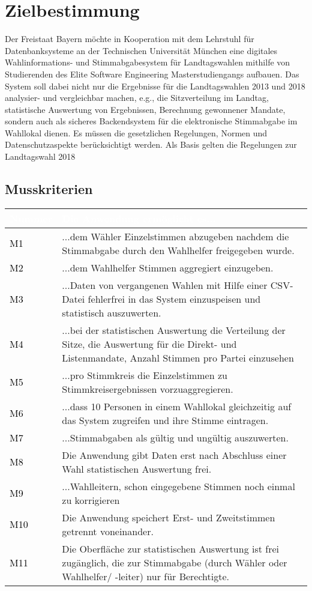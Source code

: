 \documentclass[a4paper,12pt]{article}
\newcommand\addrow[2]{\textcolor{black}{#1} &#2\\ \hline}
\newcommand\addheading[2]{\rowcolor{TUMBlue}\textcolor{white}{#1} & \textcolor{white}{#2}\\ \hline}
\newcommand\tabularhead{\begin{tabular}{|b|p{13cm}|}
\hline
}
\newenvironment{usecase}{\tabularhead}
{\hline\end{tabular}}
\begin{document}
 \setcounter{page}{2}

 \tableofcontents          %
 \clearpage
 
\section{Zielbestimmung}
Der Freistaat Bayern möchte in Kooperation mit dem Lehrstuhl für 
Datenbanksysteme an der Technischen Universität München eine digitales 
Wahlinformations- und Stimmabgabesystem für Landtagswahlen mithilfe von 
Studierenden des Elite Software Engineering Masterstudiengangs aufbauen.
%
Das System soll dabei nicht nur die Ergebnisse für die Landtagswahlen 
2013 und 2018 analysier- und vergleichbar machen, e.g., die Sitzverteilung 
im Landtag, statistische Auswertung von Ergebnissen, Berechnung gewonnener
Mandate, sondern auch als sicheres Backendsystem für die elektronische 
Stimmabgabe im Wahllokal dienen. 
%
Es müssen die gesetzlichen Regelungen, Normen und Datenschutzaspekte
berücksichtigt werden. Als Basis gelten die Regelungen zur
Landtagswahl 2018


\subsection{Musskriterien}
\begin{usecase}
	\addheading{Nummer}{Die Anwendung ermöglicht es...} 
	\addrow{M1}{...dem Wähler Einzelstimmen abzugeben nachdem die Stimmabgabe durch den Wahlhelfer freigegeben wurde.}
	\addrow{M2}{...dem Wahlhelfer Stimmen aggregiert einzugeben.}
	\addrow{M3}{...Daten von vergangenen Wahlen mit Hilfe einer CSV-Datei fehlerfrei in das System einzuspeisen und statistisch auszuwerten.}
	\addrow{M4}{...bei der statistischen Auswertung die Verteilung der Sitze, die Auswertung für die Direkt- und Listenmandate, Anzahl Stimmen pro Partei einzusehen}
	\addrow{M5}{...pro Stimmkreis die Einzelstimmen zu Stimmkreisergebnissen vorzuaggregieren.}
	\addrow{M6}{...dass 10 Personen in einem Wahllokal gleichzeitig auf das System zugreifen und ihre Stimme eintragen.}
	\addrow{M7}{...Stimmabgaben als gültig und ungültig auszuwerten.}
	\addrow{M8}{Die Anwendung gibt Daten erst nach Abschluss einer Wahl statistischen Auswertung frei.}
	\addrow{M9}{...Wahlleitern, schon eingegebene Stimmen noch einmal zu korrigieren}
	\addrow{M10}{Die Anwendung speichert Erst- und Zweitstimmen getrennt voneinander.}
	\addrow{M11}{Die Oberfläche zur statistischen Auswertung ist frei zugänglich, die zur Stimmabgabe (durch Wähler oder Wahlhelfer/ -leiter) nur für Berechtigte.}
	
\end{usecase}
\end{document}
